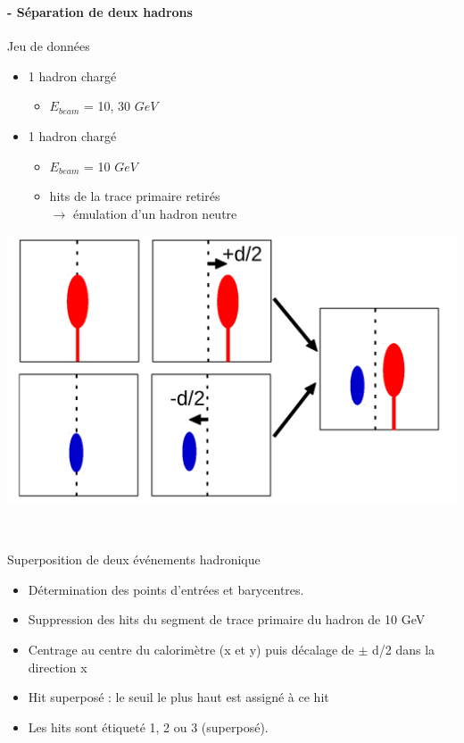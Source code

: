 \documentclass[8pt]{beamer}
\begin{document}
  \begin{frame}
  \frametitle{\secname}
  \framesubtitle{\subsecname - Séparation de deux hadrons}
    \begin{minipage}{0.41\linewidth}
      \begin{block}{Jeu de données}
        \begin{itemize}
          \item 1 hadron chargé
          \begin{itemize}
            \item $E_{beam}$ = 10, 30 $GeV$
          \end{itemize}
          \item 1 hadron chargé
          \begin{itemize}
            \item $E_{beam}$ = 10 $GeV$
            \item hits de la trace primaire retirés \\
            $\rightarrow$ émulation d'un hadron neutre
          \end{itemize}
        \end{itemize}
      \end{block}
    \end{minipage} \hfill
    \begin{minipage}{0.55\linewidth}
      \begin{center}
        \includegraphics[width=\linewidth]{OverlayEvent.pdf}
      \end{center}
    \end{minipage}
    ~ \\
    \begin{block}{Superposition de deux événements hadronique}
      \begin{itemize}
        \item Détermination des points d'entrées et barycentres.
        \item Suppression des hits du segment de trace primaire du hadron de 10 GeV
        \item Centrage au centre du calorimètre (x et y) puis décalage de $\pm$ d/2 dans la direction x
        \item Hit superposé : le seuil le plus haut est assigné à ce hit
        \item Les hits sont étiqueté 1, 2 ou 3 (superposé).
      \end{itemize}
    \end{block}
  \end{frame}
\end{document}
